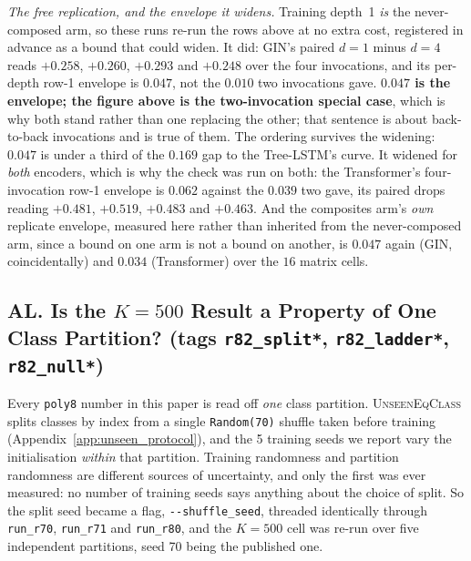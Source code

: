 \emph{The free replication, and the envelope it widens.} Training depth~1 \emph{is} the never-composed arm, so
these runs re-run the rows above at no extra cost, registered in advance as a bound that could widen. It did:
GIN's paired $d{=}1$ minus $d{=}4$ reads $+0.258$, $+0.260$, $+0.293$ and $+0.248$ over the four invocations, and
its per-depth row-1 envelope is $0.047$, not the $0.010$ two invocations gave. \textbf{$0.047$ is the envelope;
the figure above is the two-invocation special case}, which is why both stand rather than one replacing the
other; that sentence is about back-to-back invocations and is true of them. The ordering survives the
widening: $0.047$ is under a third of the $0.169$ gap to the Tree-LSTM's curve. It widened for \emph{both}
encoders, which is why the check was run on both: the Transformer's four-invocation row-1 envelope is $0.062$
against the $0.039$ two gave, its paired drops reading $+0.481$, $+0.519$, $+0.483$ and $+0.463$. And the
composites arm's \emph{own} replicate envelope, measured here rather than inherited from the never-composed
arm, since a bound on one arm is not a bound on another, is $0.047$ again (GIN, coincidentally) and $0.034$
(Transformer) over the $16$ matrix cells.

\subsection*{AL. Is the $K{=}500$ Result a Property of One Class Partition? (tags \texttt{r82\_split*}, \texttt{r82\_ladder*}, \texttt{r82\_null*})}

Every \texttt{poly8} number in this paper is read off \emph{one} class partition. \textsc{UnseenEqClass} splits classes by index from a single \texttt{Random(70)} shuffle taken before training (Appendix~\ref{app:unseen_protocol}), and the 5 training seeds we report vary the initialisation \emph{within} that partition. Training randomness and partition randomness are different sources of uncertainty, and only the first was ever measured: no number of training seeds says anything about the choice of split. So the split seed became a flag, \texttt{-{}-shuffle\_seed}, threaded identically through \texttt{run\_r70}, \texttt{run\_r71} and \texttt{run\_r80}, and the $K{=}500$ cell was re-run over five independent partitions, seed 70 being the published one.

